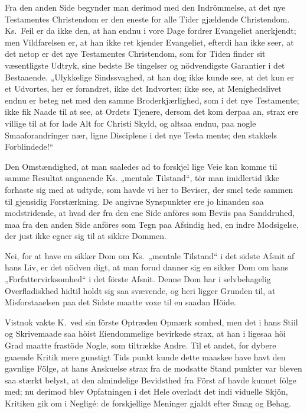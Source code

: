 \documentclass[12pt,a4paper]{article}
\newcommand{\opage}[1]{\marginnote{\footnotesize\textit{[#1]}}}
\begin{document}
Fra den anden Side begynder man derimod med
den Indrömmelse, at det nye Testamentes Christendom
er den eneste for alle Tider gjældende Christendom.
Ks.\ Feil er da ikke den, at han endnu i vore Dage
fordrer Evangeliet anerkjendt; men Vildfarelsen er, at
\opage{4} %
han ikke ret kjender Evangeliet, efterdi han ikke seer,
at det netop er det nye Testamentes Christendom, som
for Tiden finder sit væsentligste Udtryk, sine bedste Be\-%
tingelser og nödvendigste Garantier i det Bestaaende.
„Ulykkelige Sindssvaghed, at han dog ikke kunde see,
at det kun er et Udvortes, her er forandret, ikke det
Indvortes; ikke see, at Menighedslivet endnu er beteg\-%
net med den samme Broderkjærlighed, som i det nye
Testamente; ikke fik Naade til at see, at Ordets Tjenere,
dersom det kom derpaa an, strax ere villige til at for\-%
lade Alt for Christi Skyld, og altsaa endnu, paa nogle
Smaaforandringer nær, ligne Disciplene i det nye Testa\-%
mente; den stakkels Forblindede!“

Den Omstændighed, at man saaledes ad to forskjel\-%
lige Veie kan komme til samme Resultat angaaende Ks.
„mentale Tilstand“, tör man imidlertid ikke forhaste sig
med at udtyde, som havde vi her to Beviser, der smel\-%
tede sammen til gjensidig Forstærkning. De angivne
Synspunkter ere jo hinanden saa modstridende, at hvad
der fra den ene Side anföres som Beviis paa Sanddruhed,
maa fra den anden Side anföres som Tegn paa Afsindig\-%
hed, en indre Modsigelse, der just ikke egner sig til at
sikkre Dommen.

Nei, for at have en sikker Dom om Ks.\ „mentale
Tilstand“ i det sidste Afsnit af hans Liv, er det nödven\-%
digt, at man forud danner sig en sikker Dom om hans
„Forfattervirksomhed“ i det förste Afsnit. Denne Dom
har i selvbehagelig Overfladiskhed hidtil holdt sig saa
svævende, og heri ligger Grunden til, at Misforstaaelsen
paa det Sidste maatte voxe til en saadan Höide.

Vistnok vakte K.\ ved sin förste Optræden Opmærk\-%
somhed, men det i hans Stiil og Skrivemaade saa höist
Eiendommelige bevirkede strax, at han i ligesaa höi
Grad maatte frastöde Nogle, som tiltrække Andre. Til
et andet, for dybere gaaende Kritik mere gunstigt Tids\-%
punkt kunde dette maaskee have havt den gavnlige
\opage{5} %
Fölge, at hans Anskuelse strax fra de modsatte Stand\-%
punkter var bleven saa stærkt belyst, at den almindelige
Bevidsthed fra Först af havde kunnet fölge med; nu
derimod blev Opfatningen i det Hele overladt det indi\-%
viduelle Skjön, Kritiken gik om i Negligé: de forskjellige
Meninger gjaldt efter Smag og Behag.
\end{document}
